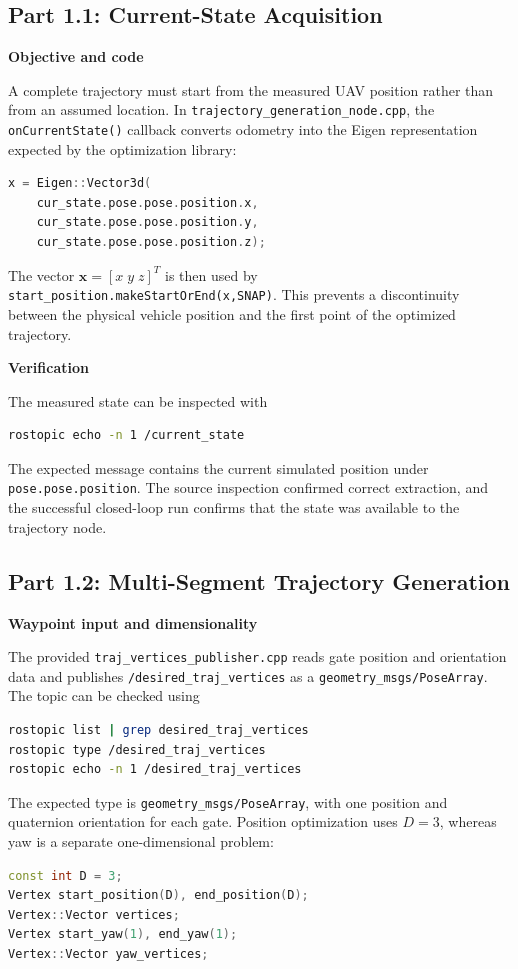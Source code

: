 \documentclass[letterpaper,10pt,conference]{IEEEtran}
\newcommand{\vect}[1]{\bm{#1}}
\newcommand{\labstep}[1]{%
  \par\vspace{0.38\baselineskip}%
  \noindent\textbf{#1}\par\nobreak
  \vspace{0.10\baselineskip}%
}
\begin{document}
\subsection{Part 1.1: Current-State Acquisition}
\labstep{Objective and code}
A complete trajectory must start from the measured UAV position rather than from an assumed location. In \texttt{trajectory\_generation\_node.cpp}, the \texttt{onCurrentState()} callback converts odometry into the Eigen representation expected by the optimization library:
\begin{lstlisting}[language=C++]
x = Eigen::Vector3d(
    cur_state.pose.pose.position.x,
    cur_state.pose.pose.position.y,
    cur_state.pose.pose.position.z);
\end{lstlisting}
The vector $\vect{x}=[x\;y\;z]^T$ is then used by \texttt{start\_position.makeStartOrEnd(x,SNAP)}. This prevents a discontinuity between the physical vehicle position and the first point of the optimized trajectory.

\labstep{Verification}
The measured state can be inspected with
\begin{lstlisting}[language=bash]
rostopic echo -n 1 /current_state
\end{lstlisting}
The expected message contains the current simulated position under \texttt{pose.pose.position}. The source inspection confirmed correct extraction, and the successful closed-loop run confirms that the state was available to the trajectory node.

\subsection{Part 1.2: Multi-Segment Trajectory Generation}
\labstep{Waypoint input and dimensionality}
The provided \texttt{traj\_vertices\_publisher.cpp} reads gate position and orientation data and publishes \texttt{/desired\_traj\_vertices} as a \texttt{geometry\_msgs/PoseArray}. The topic can be checked using
\begin{lstlisting}[language=bash]
rostopic list | grep desired_traj_vertices
rostopic type /desired_traj_vertices
rostopic echo -n 1 /desired_traj_vertices
\end{lstlisting}
The expected type is \texttt{geometry\_msgs/PoseArray}, with one position and quaternion orientation for each gate. Position optimization uses $D=3$, whereas yaw is a separate one-dimensional problem:
\begin{lstlisting}[language=C++]
const int D = 3;
Vertex start_position(D), end_position(D);
Vertex::Vector vertices;
Vertex start_yaw(1), end_yaw(1);
Vertex::Vector yaw_vertices;
\end{lstlisting}
\end{document}
